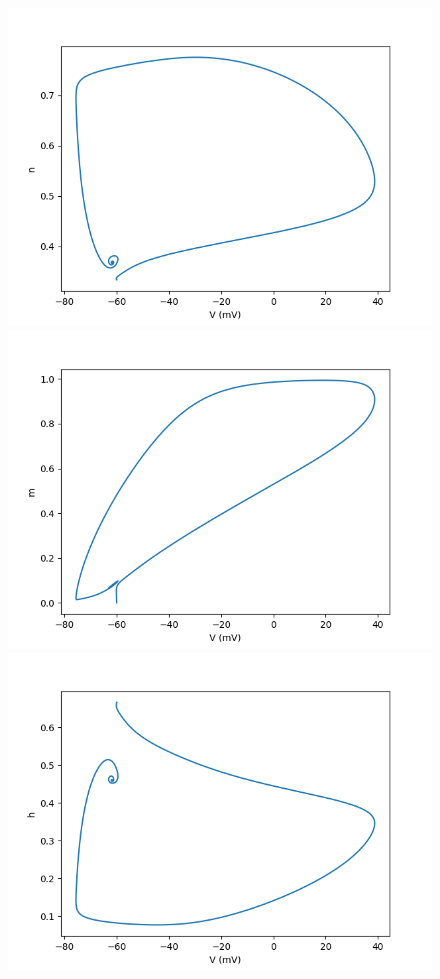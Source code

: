 \documentclass[12pt]{scrartcl}
\begin{document}
\begin{figure}[!h]
\begin{minipage}[l]{.3\linewidth}
\centering
\includegraphics[scale=0.35]{imgs/hh12.png}
\end{minipage}\hfill
\begin{minipage}[l]{.3\linewidth}
\centering
\includegraphics[scale=0.35]{imgs/hh13.png}
\end{minipage}\hfill
\begin{minipage}[l]{.3\linewidth}
\centering
\includegraphics[scale=0.35]{imgs/hh14.png}

\end{minipage}
\end{figure}
\end{document}
